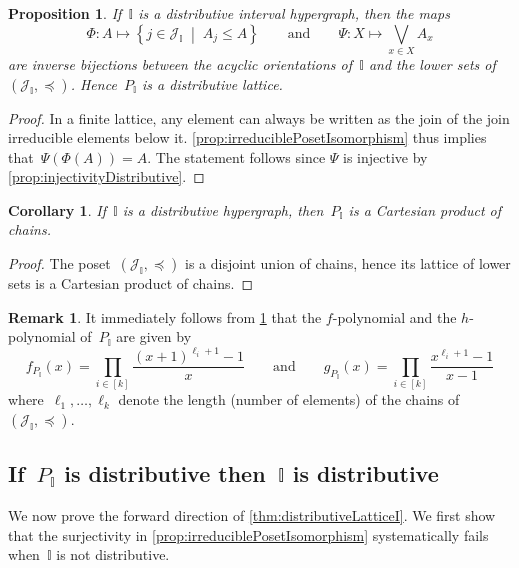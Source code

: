 \documentclass{amsart}
\newtheorem{corollary}[theorem]{Corollary}
\newtheorem{proposition}[theorem]{Proposition}
\theoremstyle{definition}
\newtheorem{remark}[theorem]{Remark}
\newcommand{\cal}[1]{\mathcal{#1}} %
\newcommand{\set}[2]{\left\{ #1 \;\middle|\; #2 \right\}} %
\newcommand{\bigJoin}{\bigvee} %
\newcommand{\II}{\mathbb I} %
\newcommand{\cJ}{\cal{J}} %
\begin{document}
\begin{proposition}
\label{prop:distributiveForwardI}
If~$\II$ is a distributive interval hypergraph, then the maps
\[
\Phi : A \mapsto \set{j \in \cJ_\II}{A_j \le A}
\qquad\text{and}\qquad
\Psi : X \mapsto \bigJoin_{x \in X} A_x
\]
are inverse bijections between the acyclic orientations of~$\II$ and the lower sets of~$(\cJ_\II, \preccurlyeq)$. Hence~$P_\II$ is a distributive lattice.
\end{proposition}

\begin{proof}
In a finite lattice, any element can always be written as the join of the join irreducible elements below it.
\cref{prop:irreduciblePosetIsomorphism} thus implies that~$\Psi(\Phi(A)) = A$.
The statement follows since $\Psi$ is injective by \cref{prop:injectivityDistributive}.
\end{proof}

\begin{corollary}
\label{coro:productChains}
If~$\II$ is a distributive hypergraph, then~$P_\II$ is a Cartesian product of chains.
\end{corollary}

\begin{proof}
The poset~$(\cJ_\II, \preccurlyeq)$ is a disjoint union of chains, hence its lattice of lower sets is a Cartesian product of chains.
\end{proof}

\begin{remark}
\label{rem:fhpolynomials}
It immediately follows from \cref{coro:productChains} that the $f$-polynomial and the $h$-polynomial of~$P_\II$ are given by
\[
f_{P_\II}(x) = \prod_{i \in [k]} \frac{(x+1)^{\ell_i+1}-1}{x}
\qquad\text{and}\qquad
g_{P_\II}(x) = \prod_{i \in [k]} \frac{x^{\ell_i+1}-1}{x-1}
\]
where~$\ell_1, \dots, \ell_k$ denote the length (number of elements) of the chains of~$(\cJ_\II, \preccurlyeq)$.
\end{remark}


\subsection{If~$P_\II$ is distributive then~$\II$ is distributive}
\label{subsec:distributiveLatticeForward}

We now prove the forward direction of \cref{thm:distributiveLatticeI}.
We first show that the surjectivity in \cref{prop:irreduciblePosetIsomorphism} systematically fails when~$\II$ is not distributive.
\end{document}
